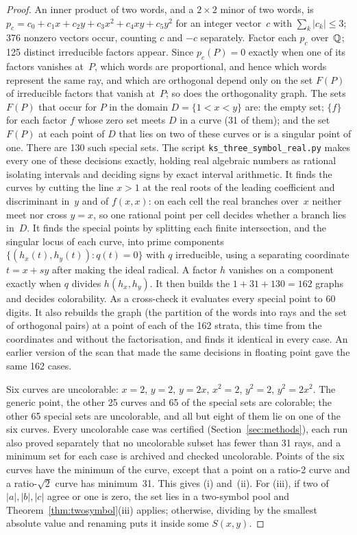 \begin{proof}
An inner product of two words, and a $2\times2$ minor of two words, is
$p_c=c_0+c_1x+c_2y+c_3x^2+c_4xy+c_5y^2$ for an integer vector~$c$ with
$\sum_k|c_k|\le3$; 376 nonzero vectors occur, counting $c$ and $-c$ separately.  Factor each $p_c$ over~$\mathbb{Q}$;
125 distinct irreducible factors appear.  Since $p_c(P)=0$ exactly when one of its factors vanishes
at~$P$, which words are proportional, and hence which words represent the same ray, and which
are orthogonal depend only on the set $F(P)$ of irreducible factors that vanish at~$P$; so
does the orthogonality graph.  The sets $F(P)$ that occur for $P$ in the domain $D=\{1<x<y\}$ are:
the empty set; $\{f\}$ for each factor $f$ whose zero set meets $D$ in a curve (31 of them); and
the set $F(P)$ at each point of $D$ that lies on two of these curves or is a singular point of
one.  There are 130 such special sets.  The script \texttt{ks\_three\_symbol\_real.py} makes
every one of these decisions exactly, holding real algebraic numbers as rational isolating
intervals and deciding signs by exact interval arithmetic.  It finds the curves by cutting the
line $x>1$ at the real roots of the leading coefficient and discriminant in~$y$ and of
$f(x,x)$: on each cell the real branches over~$x$ neither meet nor cross $y=x$, so one rational
point per cell decides whether a branch lies in~$D$.  It finds the special points by splitting
each finite intersection, and the singular locus of each curve, into prime components
$\{(h_x(t),h_y(t)) : q(t)=0\}$ with $q$ irreducible, using a separating coordinate
$t=x+sy$ after making the ideal radical.  A factor $h$ vanishes on a component exactly
when $q$ divides $h(h_x,h_y)$.  It then builds the $1+31+130=162$ graphs and decides
colorability.  As a cross-check it evaluates every special point to 60 digits.  It also
rebuilds the graph (the partition of the words into rays and the set of orthogonal pairs) at a
point of each of the 162 strata, this time from the coordinates and without the factorisation,
and finds it identical in every case.  An earlier version of the scan that made the same
decisions in floating point gave the same 162 cases.

Six curves are uncolorable: $x=2$, $y=2$, $y=2x$, $x^2=2$, $y^2=2$, $y^2=2x^2$.  The generic
point, the other 25 curves and 65 of the special sets are colorable; the other 65 special sets
are uncolorable, and all but eight of them lie on one of the six curves.  Every uncolorable case
was certified (Section~\ref{sec:methods}), each run also proved separately that no
uncolorable subset has fewer than 31 rays, and a minimum set for each case is archived and
checked uncolorable.  Points of the six curves have the minimum of the
curve, except that a point on a ratio-2 curve and a ratio-$\sqrt2$ curve has minimum~31.  This
gives (i) and~(ii).  For (iii), if two of $|a|,|b|,|c|$ agree or one is zero, the set lies in a
two-symbol pool and Theorem~\ref{thm:twosymbol}(iii) applies; otherwise, dividing by the smallest
absolute value and renaming puts it inside some $S(x,y)$.
\end{proof}

